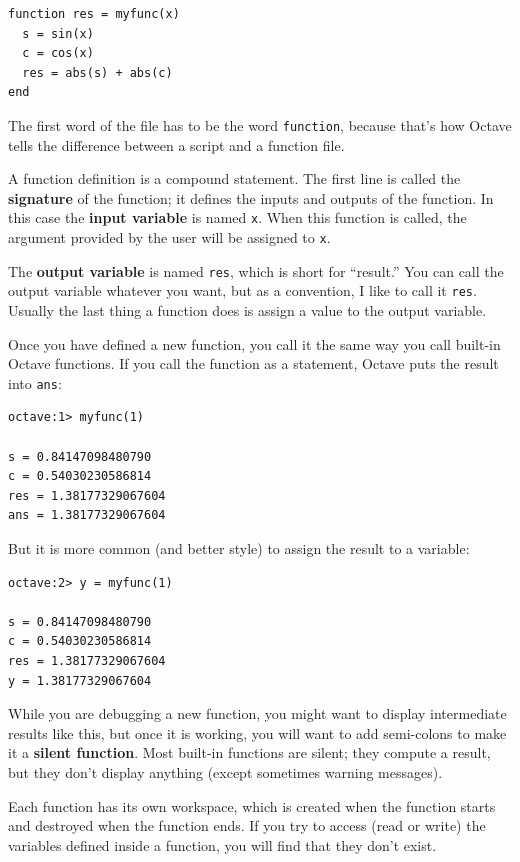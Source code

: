 \documentclass{book}
\begin{document}
\begin{verbatim}
function res = myfunc(x)
  s = sin(x)
  c = cos(x)
  res = abs(s) + abs(c)
end
\end{verbatim}

The first word of the file has to be the word {\tt function}, because
that's how Octave tells the difference between a script and a function
file.

A function definition is a compound statement. The first line
is called the {\bf signature} of the function; it defines
the inputs and outputs of the function. In this case the {\bf input
variable} is named {\tt x}. When this function is called, the
argument provided by the user will be assigned to {\tt x}.

The {\bf output variable} is named {\tt res}, which is short for
``result.'' You can call the output variable whatever you want, but
as a convention, I like to call it {\tt res}. Usually the last
thing a function does is assign a value to the output variable.

Once you have defined a new function, you call it the same way you
call built-in Octave functions. If you call the function as a statement,
Octave puts the result into {\tt ans}:

\begin{verbatim}
octave:1> myfunc(1)

s = 0.84147098480790
c = 0.54030230586814
res = 1.38177329067604
ans = 1.38177329067604
\end{verbatim}

But it is more common (and better style) to assign the result to
a variable:

\begin{verbatim}
octave:2> y = myfunc(1)

s = 0.84147098480790
c = 0.54030230586814
res = 1.38177329067604
y = 1.38177329067604
\end{verbatim}

While you are debugging a new function, you might want to display
intermediate results like this, but once it is working, you will want
to add semi-colons to make it a {\bf silent function}. Most built-in
functions are silent; they compute a result, but they don't display
anything (except sometimes warning messages).

Each function has its own workspace, which is created when the
function starts and destroyed when the function ends. If you try to
access (read or write) the variables defined inside a function, you
will find that they don't exist.
\end{document}
